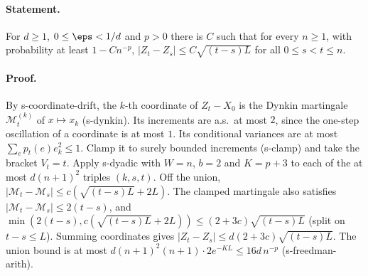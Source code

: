 \paragraph{Statement.} For $d\geq1$, $0\leq\eps<1/d$ and $p>0$ there is $C$ such that for every $n\geq1$, with
probability at least $1-Cn^{-p}$, $|Z_t-Z_s|\leq C\sqrt{(t-s)L}$ for all $0\leq s<t\leq n$.
\paragraph{Proof.} By s-coordinate-drift, the $k$-th coordinate of $Z_t-X_{0}$ is the Dynkin martingale
$\mathcal M^{(k)}_t$ of $x\mapsto x_k$ (s-dynkin). Its increments are a.s.\ at most $2$, since the one-step
oscillation of a coordinate is at most $1$. Its conditional variances are at most
$\sum_ep_t(e)e_k^2\leq1$. Clamp it to surely bounded increments (s-clamp) and take the bracket $V_t=t$. Apply
s-dyadic with $W=n$, $b=2$ and $K=p+3$ to each of the at most $d(n+1)^2$ triples $(k,s,t)$. Off the union,
$|\mathcal M_t-\mathcal M_s|\leq c(\sqrt{(t-s)L}+2L)$. The clamped martingale also satisfies $|\mathcal M_t-\mathcal M_s|\leq2(t-s)$,
and $\min(2(t-s),c(\sqrt{(t-s)L}+2L))\leq(2+3c)\sqrt{(t-s)L}$ (split on $t-s\leq L$). Summing coordinates
gives $|Z_t-Z_s|\leq d(2+3c)\sqrt{(t-s)L}$. The union bound is at most
$d(n+1)^2(n+1)\cdot2e^{-KL}\leq16d\,n^{-p}$ (s-freedman-arith).
